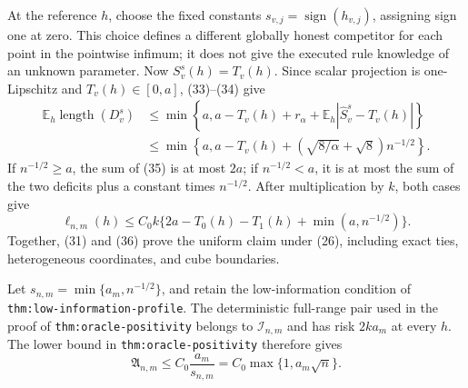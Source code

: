At the reference \(h\), choose the fixed constants
\(s_{v,j}=\operatorname{sign}(h_{v,j})\), assigning sign one at zero.  This
choice defines a different globally honest competitor for each point in the
pointwise infimum; it does not give the executed rule knowledge of an unknown
parameter.  Now \(S_v^s(h)=T_v(h)\).  Since scalar projection is
one-Lipschitz and \(T_v(h)\in[0,a]\), (33)--(34) give
\[
 \begin{split}
 \mathbb E_h\operatorname{length}(D_v^s)
 &\le\min\left\{a,
 a-T_v(h)+r_\alpha+\mathbb E_h|\widehat S_v^s-T_v(h)|\right\}\\
 &\le\min\left\{a,a-T_v(h)+
 \left(\sqrt{8/\alpha}+\sqrt8\right)n^{-1/2}\right\}.                  \tag{35}
 \end{split}
\]
If \(n^{-1/2}\ge a\), the sum of (35) is at most \(2a\); if
\(n^{-1/2}<a\), it is at most the sum of the two deficits plus a constant
times \(n^{-1/2}\).  After multiplication by \(k\), both cases give
\[
 \ell_{n,m}(h)\le
 C_0k\{2a-T_0(h)-T_1(h)+\min(a,n^{-1/2})\}.                              \tag{36}
\]
Together, (31) and (36) prove the uniform claim under (26), including exact
ties, heterogeneous coordinates, and cube boundaries.

Let \(s_{n,m}=\min\{a_m,n^{-1/2}\}\), and retain the low-information
condition of \texttt{thm:low-information-profile}.  The deterministic
full-range pair used in the proof of \texttt{thm:oracle-positivity} belongs
to \(\mathcal I_{n,m}\) and has risk \(2ka_m\) at every \(h\).  The lower
bound in \texttt{thm:oracle-positivity} therefore gives
\[
 \mathfrak A_{n,m}
 \le C_0\frac{a_m}{s_{n,m}}
 =C_0\max\{1,a_m\sqrt n\}.                                               \tag{37}
\]

